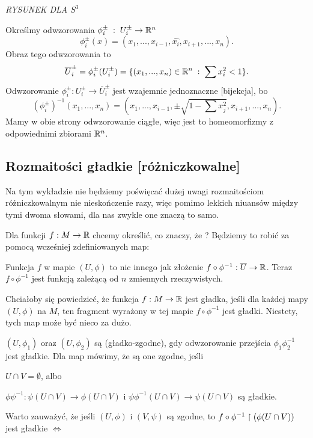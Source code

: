 \emph{\Large\color{red}RYSUNEK DLA $S^3$}

Określmy odwzorowania $\phi^\pm_i\;:\;U_i^\pm\to\mathbb{R}^n$
$$\phi_i^\pm(x)=(x_1,...,x_{i-1},\hat{x_i},x_{i+1},...,x_n).$$
Obraz tego odwzorowania to
$$\overline U_i^\pm=\phi_i^\pm(U_i^\pm)=\{(x_1,...,x_n)\in \mathbb{R}^n\;:\;\sum x_i^2<1\}.$$
Odwzorowanie $\phi_i^\pm: U_i^\pm\to\overline U_i^\pm$ jest wzajemnie jednoznaczne [bijekcja], bo
$$(\phi_i^\pm)^{-1}(x_1,...,x_n)=(x_1,...,x_{i-1}, \pm\sqrt{1-\sum x_j^2}, x_{i+1},...,x_n).$$
Mamy w obie strony odwzorowanie ciągłe, więc jest to homeomorfizmy z odpowiednimi zbiorami $\mathbb{R}^n$.

\subsection{Rozmaitości gładkie [różniczkowalne]}

Na tym wykładzie nie będziemy poświęcać dużej uwagi rozmaitościom różniczkowalnym nie nieskończenie razy, więc pomimo lekkich niuansów między tymi dwoma słowami, dla nas zwykle one znaczą to samo.
\medskip

Dla funkcji $f:M\to\mathbb{R}$ chcemy określić, co znaczy, że ? Będziemy to robić za pomocą wcześniej zdefiniowanych map:

\indent \point Funkcja $f$  w mapie $(U, \phi)$ to nic innego jak złożenie $f\circ \phi^{-1}:\overline U\to \mathbb{R}$. Teraz $f\circ\phi^{-1}$ jest funkcją zależącą od $n$ zmiennych rzeczywistych.

\indent \point Chciałoby się powiedzieć, że funkcja $f: M\to\mathbb{R}$ jest gładka, jeśli dla każdej mapy $(U, \phi)$ na $M$, ten fragment wyrażony w tej mapie $f\circ\phi^{-1}$ jest gładki. Niestety, tych map może być nieco za dużo.

\indent \point {}
\medskip

 $(U, \phi_1)$ oraz $(U, \phi_2)$ są  (gładko-zgodne), gdy odwzorowanie przejścia $\phi_1\phi_2^{-1}$ jest gładkie. Dla map  mówimy, że są one zgodne, jeśli 

\indent \point $U\cap V=\emptyset$, albo

\indent \point $\phi\psi^{-1}:\psi(U\cap V)\to \phi(U\cap V)$ i $\psi\phi^{-1}(U\cap V)\to \psi(U\cap V)$ są gładkie.

Warto zauważyć, że jeśli $(U, \phi)$ i $(V, \psi)$ są zgodne, to $f\circ\phi^{-1}\upharpoonright (\phi(U\cap V))$ jest gładkie $\iff$

